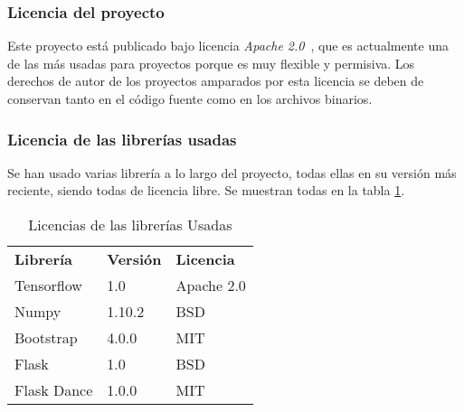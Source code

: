 \subsubsection{Licencia del proyecto}
Este proyecto está publicado bajo licencia \textit{Apache 2.0}~\cite{apache}, que es actualmente una de las más usadas para proyectos porque es muy flexible y permisiva. Los derechos de autor de los proyectos amparados por esta licencia se deben de conservan tanto en el código fuente como en los archivos binarios.

\subsubsection{Licencia de las librerías usadas}
Se han usado varias librería a lo largo del proyecto, todas ellas en su versión más reciente, siendo todas de licencia libre. Se muestran todas en la tabla \ref{tabla:licenses}.

 \begin{table}
	\begin{center}
		\begin{tabular}{p{3.5cm} p{1.5cm} p{2.5cm}}
			\toprule
			\textbf{Librería} & \textbf{Versión} & \textbf{Licencia} \\
			\otoprule
			Tensorflow & 1.0 & Apache 2.0 \\
			Numpy & 1.10.2 & BSD \\
			Bootstrap & 4.0.0 & MIT \\
			Flask & 1.0 & BSD\\
			Flask Dance & 1.0.0 & MIT \\
			\bottomrule
		\end{tabular}
		\caption{Licencias de las librerías Usadas}
		\label{tabla:licenses}
	\end{center}
\end{table}



